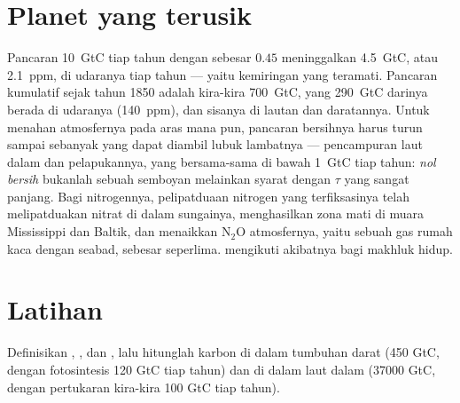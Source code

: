 \section{Planet yang terusik}

\begin{example}\label{ex:b2:biogeochemical-cycles:numbers}
Pancaran \qty{10}{GtC} tiap tahun dengan  sebesar
$0.45$ meninggalkan \qty{4.5}{GtC}, atau \qty{2.1}{ppm}, di udaranya
tiap tahun --- yaitu kemiringan yang teramati. Pancaran kumulatif sejak
tahun 1850 adalah kira-kira \qty{700}{GtC}, yang \qty{290}{GtC} darinya
berada di udaranya (140~ppm), dan sisanya di lautan dan daratannya.
Untuk menahan atmosfernya pada aras mana pun, pancaran bersihnya harus
turun sampai sebanyak yang dapat diambil lubuk lambatnya ---
pencampuran laut dalam dan pelapukannya, yang bersama-sama di bawah
\qty{1}{GtC} tiap tahun: \emph{nol bersih} bukanlah sebuah semboyan
melainkan syarat   dengan $\tau$ yang sangat
panjang. Bagi nitrogennya, pelipatduaan  nitrogen yang
terfiksasinya telah melipatduakan nitrat di dalam sungainya,
menghasilkan zona mati di muara Mississippi dan Baltik, dan menaikkan
$\mathrm{N_2O}$ atmosfernya, yaitu sebuah gas rumah kaca dengan  seabad, sebesar seperlima.  mengikuti
akibatnya bagi makhluk hidup.
\end{example}

\section{Latihan}

\begin{exercise}[$\star$]\label{exo:b2:biogeochemical-cycles:1}
Definisikan , , dan , lalu hitunglah  karbon di dalam tumbuhan darat (450 GtC, dengan fotosintesis
120 GtC tiap tahun) dan di dalam laut dalam (\num{37000} GtC, dengan
pertukaran kira-kira 100 GtC tiap tahun).
\end{exercise}

